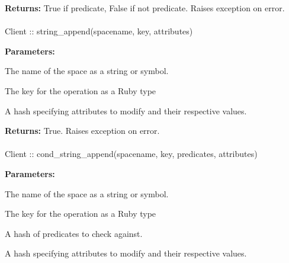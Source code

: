 \noindent\textbf{Returns:}
True if predicate, False if not predicate.  Raises exception on error.

\paragraph{}
\label{api:ruby:string_append}
\begin{ccode}
Client :: string_append(spacename, key, attributes)
\end{ccode}
\funcdesc 

\noindent\textbf{Parameters:}
\begin{description}[labelindent=\widthof{{\code{attributes}}},leftmargin=*,noitemsep,nolistsep,align=right]
\item[\code{spacename}] The name of the space as a string or symbol.
\item[\code{key}] The key for the operation as a Ruby type
\item[\code{attributes}] A hash specifying attributes to modify and their respective values.
\end{description}

\noindent\textbf{Returns:}
True.  Raises exception on error.

\paragraph{}
\label{api:ruby:cond_string_append}
\begin{ccode}
Client :: cond_string_append(spacename, key, predicates, attributes)
\end{ccode}
\funcdesc 

\noindent\textbf{Parameters:}
\begin{description}[labelindent=\widthof{{\code{predicates}}},leftmargin=*,noitemsep,nolistsep,align=right]
\item[\code{spacename}] The name of the space as a string or symbol.
\item[\code{key}] The key for the operation as a Ruby type
\item[\code{predicates}] A hash of predicates to check against.
\item[\code{attributes}] A hash specifying attributes to modify and their respective values.
\end{description}

